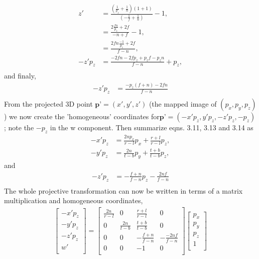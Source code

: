 \documentclass[
11pt, %
english, %
singlespacing, %
headsepline, %
]{MastersDoctoralThesis} %
\begin{document}
\begin{align*} z'&= \frac{(\frac{1}{p_z}+ \frac{1}{n})(1+1)}{(-\frac{1}{f} + \frac{1}{n})} - 1, \tag{3.13} \\
&= \frac{2\frac{fn}{p_z} +2f}{-n+f} -1,\\
&= \frac{2fn\frac{-1}{p_z} +2f}{f-n} ,\\
-z'p_z &= \frac{-2fn -2fp_z +p_zf -p_zn}{f-n} + p_z ,\\
\end{align*}
and finaly,
\begin{align*} -z'p_z &= \frac{-p_z(f+n)-2fn}{f-n} \tag{3.14} \\
\end{align*}
From the projected 3D point $\textbf{p'} = (x', y', z')$ (the mapped image of $(p_x, p_y, p_z)$) we now create the 'homogeneous' coordinates for$\textbf{p'} = (-x'p_z, y'p_z, -z'p_z, -p_z)$; note the $-p_z$ in the w component. Then summarize eqns. 3.11, 3.13 and 3.14 as
\begin{align*}  -x'p_z &= \frac{2np_x}{r-l}p_x + \frac{r+l}{r-l}p_z, \tag{3.15} \\ -y'p_z &= \frac{2n}{t-b}p_y + \frac{t+b}{t-b}p_z, \tag{3.16}
\end{align*}
and
\begin{align*} -z'p_z &= -\frac{f+n}{f-n}p_z - \frac{2nf}{f-n} \tag{3.17} \\
\end{align*}
The whole projective transformation can now be written in terms of a matrix multiplication and homogeneous coordinates,
\begin{align*} 
\begin{bmatrix}
-x'p_z \\ -y'p_z \\ -z'p_z \\ w' \\ 
\end{bmatrix} = 
\begin{bmatrix}
\frac{2n}{r-l} & 0 & \frac{r+l}{r-l} & 0 \\
0 & \frac{2n}{t-b} & \frac{t+b}{t-b} & 0 \\
0 & 0 & -\frac{f+n}{f-n} & -\frac{-2nf}{f-n} \\
0 & 0 & -1 & 0 \\
\end{bmatrix}
\begin{bmatrix}
p_x \\ p_y \\ p_z \\ 1 \\
\end{bmatrix} \tag{3.18}
\end{align*}
\end{document}
